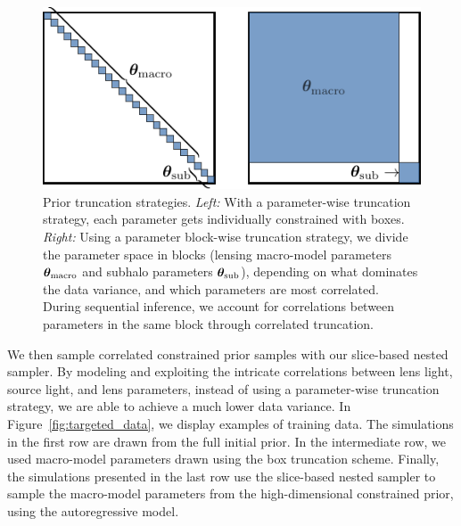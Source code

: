 \begin{figure}
	\centering
	\includegraphics[width=0.8\linewidth]{TikZ/truncation_blocks.pdf}
	\caption{Prior truncation strategies. \emph{Left:} With a parameter-wise truncation strategy, each parameter gets individually constrained with boxes. \emph{Right:} Using a parameter block-wise truncation strategy, we divide the parameter space in blocks (lensing macro-model parameters $\bm{\theta}_\mathrm{macro}$ and subhalo parameters $\bm{\theta}_\mathrm{sub}$), depending on what dominates the data variance, and which parameters are most correlated. During sequential inference, we account for correlations between parameters in the same block through correlated truncation.}
	\label{fig:block}
\end{figure}

We then sample correlated constrained prior samples with our slice-based nested sampler. By modeling and exploiting the intricate correlations between lens light, source light, and lens parameters, instead of using a parameter-wise truncation strategy, we are able to achieve a much lower data variance. In Figure~\ref{fig:targeted_data}, we display examples of training data. The simulations in the first row are drawn from the full initial prior. In the intermediate row, we used macro-model parameters drawn using the box truncation scheme. Finally, the simulations presented in the last row use the slice-based nested sampler to sample the macro-model parameters from the high-dimensional constrained prior, using the autoregressive model.

